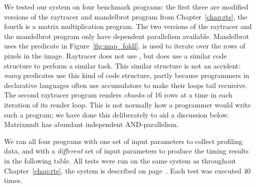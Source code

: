 We tested our system on four benchmark programs:
the first three are modified versions of the raytracer and mandelbrot
program from Chapter~\ref{chap:rts},
the fourth is a matrix multiplication program.
The two versions of the raytracer and the mandelbrot program only have
dependent parallelism available.
Mandelbrot uses the \mapfoldl predicate in Figure~\ref{fig:map_foldl}.
\mapfoldl is used to iterate over the rows of pixels in the image.
Raytracer does not use ,
but does use a similar code structure to perform a similar task.
This similar structure is not an accident:
\emph{many} predicates use this kind of code structure,
partly because programmers in declarative languages
often use accumulators to make their loops tail recursive.
The second raytracer program renders \emph{chunks} of 16 rows at a time in
each iteration of its render loop.
This is not normally how a programmer would write such a program;
we have done this deliberately to aid a discussion below.
Matrixmult has abundant independent AND-parallelism.

We ran all four programs
with one set of input parameters to collect profiling data,
and with a \emph{different} set of input parameters to produce
the timing results in the following table.
All tests were run on the same system as throughout Chapter~\ref{chap:rts},
the system is described on page~\pageref{cabsav}.
Each test was executed 40 times.


